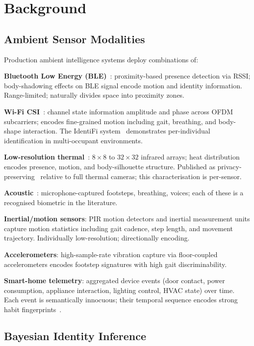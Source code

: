 \documentclass[sigconf,nonacm]{acmart}
\begin{document}
\section{Background}

\subsection{Ambient Sensor Modalities}

Production ambient intelligence systems deploy combinations of:

\textbf{Bluetooth Low Energy (BLE)}~\cite{conte2024blesensing}:
proximity-based presence detection via RSSI; body-shadowing
effects on BLE signal encode motion and identity information.
Range-limited; naturally divides space into proximity zones.

\textbf{Wi-Fi CSI}~\cite{hori2024merl,rizk2025identifi}: channel
state information amplitude and phase across OFDM subcarriers;
encodes fine-grained motion including gait, breathing, and
body-shape interaction. The IdentiFi
system~\cite{rizk2025identifi} demonstrates per-individual
identification in multi-occupant environments.

\textbf{Low-resolution thermal}~\cite{xie2024tadar}: $8{\times}8$
to $32{\times}32$ infrared arrays; heat distribution encodes
presence, motion, and body-silhouette structure. Published as
privacy-preserving~\cite{xie2024tadar} relative to full thermal
cameras; this characterisation is per-sensor.

\textbf{Acoustic}~\cite{george2025tinyml}: microphone-captured
footsteps, breathing, voices; each of these is a recognised
biometric in the literature.

\textbf{Inertial/motion sensors}: PIR motion detectors and
inertial measurement units capture motion statistics including
gait cadence, step length, and movement trajectory. Individually
low-resolution; directionally encoding.

\textbf{Accelerometers}: high-sample-rate vibration capture via
floor-coupled accelerometers encodes footstep signatures with
high gait discriminability.

\textbf{Smart-home telemetry}: aggregated device events (door
contact, power consumption, appliance interaction, lighting
control, HVAC state) over time. Each event is semantically
innocuous; their temporal sequence encodes strong habit
fingerprints~\cite{song2024habitinference,nguyen2024smarthome}.

\subsection{Bayesian Identity Inference}
\end{document}
